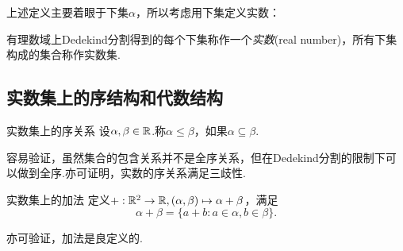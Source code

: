 上述定义主要着眼于下集$\alpha$，所以考虑用下集定义实数：

\begin{definition}
	有理数域上Dedekind分割得到的每个下集称作一个\textit{实数}(real number)，所有下集构成的集合称作实数集.
\end{definition}

\subsection{实数集上的序结构和代数结构}

\begin{definition}{实数集上的序关系}
	设$\alpha ,\beta \in \mathbb{R}$.称$\alpha \leq \beta$，如果$\alpha \subseteq \beta$.
\end{definition}

容易验证，虽然集合的包含关系并不是全序关系，但在Dedekind分割的限制下可以做到全序.亦可证明，实数的序关系满足三歧性.

\begin{definition}{实数集上的加法}
	定义$+:\mathbb{R} ^2 \to \mathbb{R} ,(\alpha ,\beta) \mapsto \alpha + \beta$，满足$$\alpha + \beta = \{ a+b:a \in \alpha ,b \in \beta \}.$$
\end{definition}

亦可验证，加法是良定义的.

